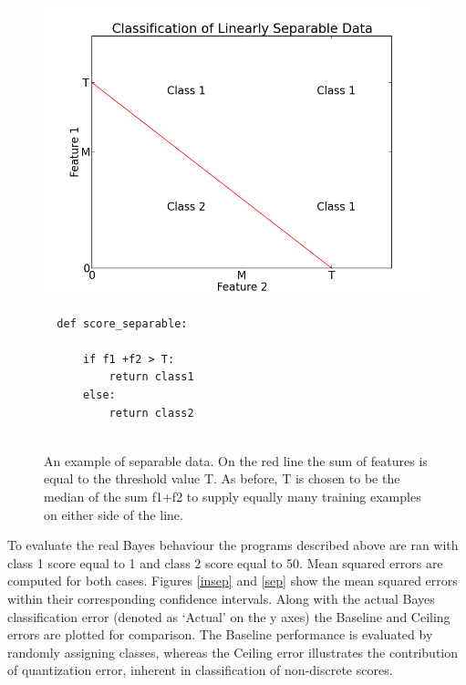 \documentclass[12pt,notitlepage,twoside]{scrreprt}
\begin{document}
\begin{figure}[h!]
\begin{minipage}[b]{0.55\linewidth}
  \includegraphics[width=1.2\linewidth]{figs/gen_sep.png}
\end{minipage}
\hspace{0.5cm}
\begin{minipage}[b]{0.4\linewidth}
\begin{verbatim}
  def score_separable:

      if f1 +f2 > T:
          return class1
      else:
          return class2


\end{verbatim}
\end{minipage}
\caption{An example of separable data. On the red line the sum of features is equal to the
threshold value T.  As before, T is chosen to be the median of the sum f1+f2 to supply
equally many training examples on either side of the line. \label{code:sep}}
\end{figure}

To evaluate the real Bayes behaviour the programs described above are ran with class 1
score equal to 1 and class 2 score equal to 50. Mean squared errors are computed for both cases.
Figures \ref{insep} and \ref{sep} show the mean squared errors within their corresponding
confidence intervals.  Along with the actual Bayes classification error (denoted as
`Actual' on the y axes) the Baseline and Ceiling errors are plotted for comparison. The
Baseline performance is evaluated by randomly assigning classes, whereas the Ceiling error
illustrates the contribution of quantization error, inherent in classification of
non-discrete scores.
\end{document}
